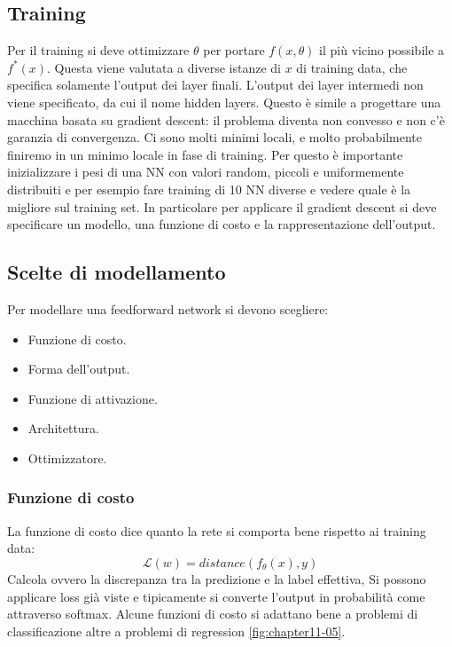 	\subsection{Training}
	Per il training si deve ottimizzare $\theta$ per portare $f(x,\theta)$ il pi\`u vicino possibile a $f^*(x)$.
	Questa viene valutata a diverse istanze di $x$ di training data, che specifica solamente l'output dei layer finali.
	L'output dei layer intermedi non viene specificato, da cui il nome hidden layers.
	Questo \`e simile a progettare una macchina basata su gradient descent: il problema diventa non convesso e non c'\`e garanzia di convergenza. Ci sono molti minimi locali, e molto probabilmente finiremo in un minimo locale in fase di training. 
	Per questo \`e importante inizializzare i pesi di una NN con valori random, piccoli e uniformemente distribuiti e per esempio fare training di 10 NN diverse e vedere quale \`e la migliore sul training set.
	In particolare per applicare il gradient descent si deve specificare un modello, una funzione di costo e la rappresentazione dell'output.
	
	\subsection{Scelte di modellamento}
	Per modellare una feedforward network si devono scegliere:
	\begin{multicols}{2}
		\begin{itemize}
			\item Funzione di costo.
			\item Forma dell'output.
			\item Funzione di attivazione.
			\item Architettura.
			\item Ottimizzatore.
		\end{itemize}
	\end{multicols}

		\subsubsection{Funzione di costo}
		La funzione di costo dice quanto la rete si comporta bene rispetto ai training data:
		$$\mathcal{L}(w) = distance(f_\theta(x), y)$$
		Calcola ovvero la discrepanza tra la predizione e la label effettiva,
		Si possono applicare loss gi\`a viste e tipicamente si converte l'output in probabilit\`a come attraverso softmax. 
		Alcune funzioni di costo si adattano bene a problemi di classificazione altre a problemi di regression \ref{fig:chapter11-05}.

